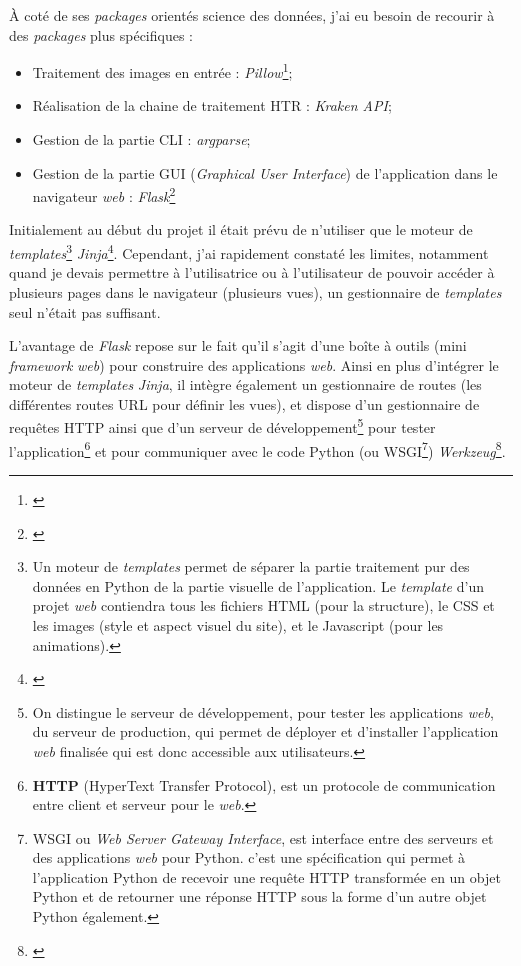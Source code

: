 À coté de ses \textit{packages} orientés science des données, j'ai eu besoin de recourir à des \textit{packages} plus spécifiques : 

\begin{itemize}
    \item Traitement des images en entrée : \textit{Pillow}\footnote{\cite{noauthor_pillow_nodate}};
    \item Réalisation de la chaine de traitement HTR : \textit{Kraken API};
    \item Gestion de la partie CLI : \textit{argparse};
    \item Gestion de la partie GUI (\textit{Graphical User Interface}) de l'application dans le navigateur \textit{web} : \textit{Flask}\footnote{\cite{noauthor_flask_nodate}}
\end{itemize}

Initialement au début du projet il était prévu de n'utiliser que le moteur de \textit{templates}\footnote{Un moteur de \textit{templates} permet de séparer la partie traitement pur des données en Python de la partie visuelle de l'application. Le \textit{template} d'un projet \textit{web} contiendra tous les fichiers HTML (pour la structure), le CSS et les images (style et aspect visuel du site), et le Javascript (pour les animations).} \textit{Jinja}\footnote{\cite{noauthor_jinja_nodate}}. Cependant, j'ai rapidement constaté les limites, notamment quand je devais permettre à l'utilisatrice ou à l'utilisateur de pouvoir accéder à plusieurs pages dans le navigateur (plusieurs vues), un gestionnaire de \textit{templates} seul n'était pas suffisant. 

L'avantage de \textit{Flask} repose sur le fait qu'il s'agit d'une boîte à outils (mini \textit{framework} \textit{web}) pour construire des applications \textit{web}. Ainsi en plus d'intégrer le moteur de \textit{templates} \textit{Jinja}, il intègre également un gestionnaire de routes (les différentes routes URL pour définir les vues), et dispose d'un gestionnaire de requêtes HTTP ainsi que d'un serveur de développement\footnote{On distingue le serveur de développement, pour tester les applications \textit{web}, du serveur de production, qui permet de déployer et d'installer l'application \textit{web} finalisée qui est donc accessible aux utilisateurs.} pour tester l'application\footnote{\textbf{HTTP} (HyperText Transfer Protocol), est un protocole de communication entre client et serveur pour le \textit{web}.} et pour communiquer avec le code Python (ou WSGI\footnote{WSGI ou \textit{Web Server Gateway Interface}, est interface entre des serveurs et des applications \textit{web} pour Python. c'est une spécification qui permet à l'application Python de recevoir une requête HTTP transformée en un objet Python et de retourner une réponse HTTP sous la forme d’un autre objet Python également.}) \textit{Werkzeug}\footnote{\cite{noauthor_werkzeug_nodate}}.\\

